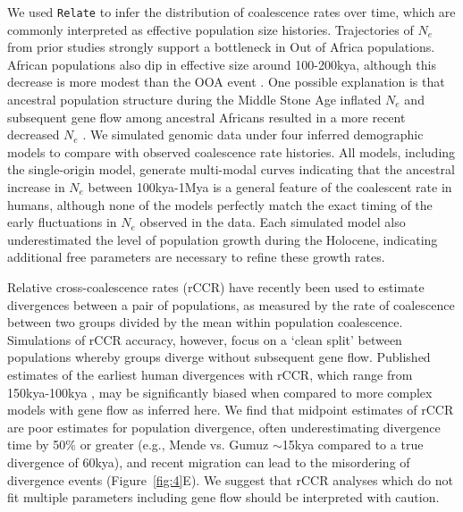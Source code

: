 \documentclass{article}
\begin{document}
We used \texttt{Relate} \citep{Speidel2019-nj} to infer the distribution of
coalescence rates over time, which are commonly interpreted as effective
population size histories. Trajectories of $N_e$ from prior studies strongly
support a bottleneck in Out of Africa populations. African populations also dip
in effective size around 100-200kya, although this decrease is more modest than
the OOA event \citep{Mallick2016-lx}. One possible explanation is that
ancestral population structure during the Middle Stone Age inflated $N_e$ and
subsequent gene flow among ancestral Africans resulted in a more recent
decreased $N_e$ \citep{Mazet2016-wn}.
We simulated genomic data under four inferred demographic models to compare
with observed coalescence rate histories. All models, including the
single-origin model, generate multi-modal curves indicating that the ancestral
increase in $N_e$ between 100kya-1Mya is a general feature of the coalescent
rate in humans, although none of the models perfectly match the exact timing of
the early fluctuations in $N_e$ observed in the data.
Each simulated model also underestimated the level of population growth during
the Holocene, indicating additional free parameters are necessary to refine
these growth rates.

Relative cross-coalescence rates (rCCR) have recently been used to estimate
divergences between a pair of populations, as measured by the rate of
coalescence between two groups divided by the mean within population
coalescence. Simulations of rCCR accuracy, however, focus on a ‘clean split’
between populations whereby groups diverge without subsequent gene flow.
Published estimates of the earliest human divergences with rCCR, which range
from 150kya-100kya \citep{Bergstrom2021-iw}, may be significantly biased when
compared to more complex models with gene flow as inferred here. We find that
midpoint estimates of rCCR are poor estimates for population divergence, often
underestimating divergence time by 50\% or greater (e.g., Mende vs. Gumuz
$\sim$15kya compared to a true divergence of 60kya), and recent migration can
lead to the misordering of divergence events (Figure~\ref{fig:4}E). We suggest
that rCCR analyses which do not fit multiple parameters including gene flow
should be interpreted with caution.
\end{document}
